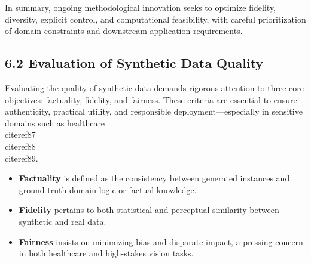 \documentclass[11pt]{article}
\begin{document}
In summary, ongoing methodological innovation seeks to optimize fidelity, diversity, explicit control, and computational feasibility, with careful prioritization of domain constraints and downstream application requirements.

\subsection{6.2 Evaluation of Synthetic Data Quality}

Evaluating the quality of synthetic data demands rigorous attention to three core objectives: factuality, fidelity, and fairness. These criteria are essential to ensure authenticity, practical utility, and responsible deployment—especially in sensitive domains such as healthcare \\cite{ref87}\\cite{ref88}\\cite{ref89}. 

\begin{itemize}
    \item \textbf{Factuality} is defined as the consistency between generated instances and ground-truth domain logic or factual knowledge.
    \item \textbf{Fidelity} pertains to both statistical and perceptual similarity between synthetic and real data.
    \item \textbf{Fairness} insists on minimizing bias and disparate impact, a pressing concern in both healthcare and high-stakes vision tasks.
\end{itemize}
\end{document}
